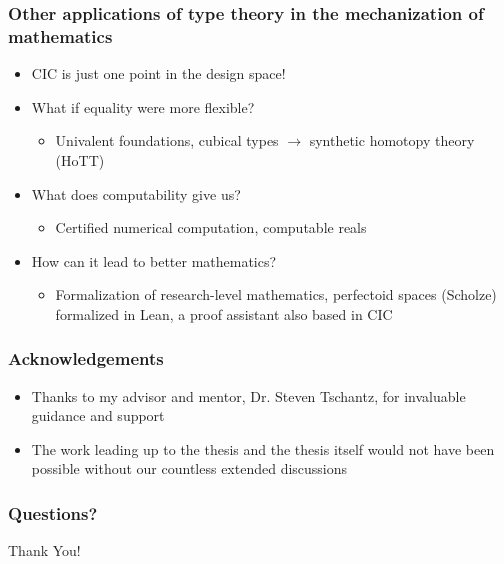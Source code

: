 \documentclass{beamer}
\begin{document}
\begin{frame}
\frametitle{Other applications of type theory in the mechanization of mathematics}
\begin{itemize}
\item CIC is just one point in the design space!
\item What if equality were more flexible?
  \begin{itemize}
  \item Univalent foundations, cubical types $\to$ synthetic homotopy
    theory (HoTT)
  \end{itemize}
\item What does computability give us?
  \begin{itemize}
  \item Certified numerical computation, computable reals
  \end{itemize}
\item How can it lead to better mathematics?
  \begin{itemize}
  \item Formalization of research-level mathematics, perfectoid spaces
    (Scholze) formalized in Lean, a proof assistant also based in CIC
  \end{itemize}
\end{itemize}
\end{frame}

\begin{frame}
\frametitle{Acknowledgements}
\begin{itemize}
\item Thanks to my advisor and mentor, Dr. Steven Tschantz, for
  invaluable guidance and support
\item The work leading up to the thesis and the thesis itself would
  not have been possible without our countless extended discussions
\end{itemize}
\end{frame}

\begin{frame}
\frametitle{Questions?}
\centering
\Huge{Thank You!}
\end{frame}
\end{document}
